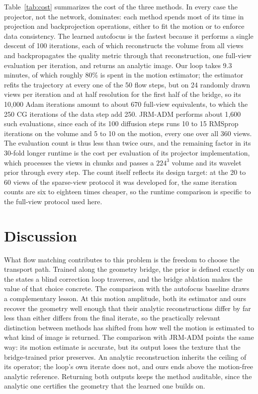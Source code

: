 \documentclass[11pt]{article}
\begin{document}
Table~\ref{tab:cost} summarizes the cost of the three methods. In every case the
projector, not the network, dominates: each method spends most of its time in
projection and backprojection operations, either to fit the motion or to enforce data
consistency. The learned autofocus is the fastest because it performs a single descent of
100 iterations, each of which reconstructs the volume from all views and backpropagates
the quality metric through that reconstruction, one full-view evaluation per iteration,
and returns an analytic image. Our loop takes 9.3 minutes, of which roughly
80\% is spent in the motion estimator; the estimator refits the trajectory at every one
of the 50 flow steps, but on 24 randomly drawn views per iteration and at half resolution
for the first half of the bridge, so its 10{,}000 Adam iterations amount to about 670
full-view equivalents, to which the 250 CG iterations of the data step add 250. JRM-ADM
performs about 1{,}600 such evaluations, since each of its 100 diffusion steps runs 10 to
15 RMSprop iterations on the volume and 5 to 10 on the motion, every one over all 360
views. The evaluation count is thus less than twice ours, and the remaining factor in its
30-fold longer runtime is the cost per evaluation of its projector implementation, which
processes the views in chunks and passes a $224^3$ volume and its wavelet prior through
every step. The count itself reflects its design target: at the 20 to 60 views of the
sparse-view protocol it was developed for, the same iteration counts are six to eighteen
times cheaper, so the runtime comparison is specific to the full-view protocol used here.

\FloatBarrier
\section{Discussion}
\label{sec:discussion}

What flow matching contributes to this problem is the freedom to choose the transport
path. Trained along the geometry bridge, the prior is defined exactly on the states a
blind correction loop traverses, and the bridge ablation makes the value of that choice
concrete. The comparison with the autofocus baseline draws a complementary lesson. At this
motion amplitude, both its estimator and ours recover the geometry well enough that their
analytic reconstructions differ by far less than either differs from the final iterate,
so the practically relevant distinction between methods has shifted from how well the
motion is estimated to what kind of image is returned. The comparison with JRM-ADM points
the same way: its motion estimate is accurate, but its output loses the texture that
the bridge-trained prior preserves. An analytic reconstruction
inherits the ceiling of its operator; the loop's own iterate does not, and ours ends above
the motion-free analytic reference. Returning both outputs keeps the method auditable, since
the analytic one certifies the geometry that the learned one builds on.
\end{document}

